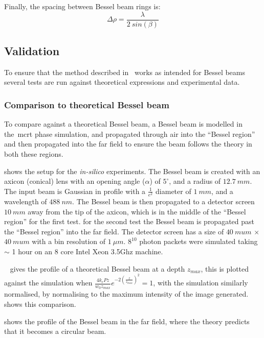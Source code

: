 Finally, the spacing between Bessel beam rings is:
\begin{equation}
\Delta \rho = \frac{\lambda}{2\ sin\left(\beta\right)}
\end{equation}

\subsection{Validation}

To ensure that the method described in~ works as intended for Bessel beams several tests are run against theoretical expressions and experimental data.

\subsubsection*{Comparison to theoretical Bessel beam}

To compare against a theoretical Bessel beam, a Bessel beam is modelled in the~\gls*{mcrt} phase simulation, and propagated through air into the ``Bessel region'' and then propagated into the far field to ensure the beam follows the theory in both these regions.

 shows the setup for the \textit{in-silico} experiments.
The Bessel beam is created with an axicon (conical) lens with an opening angle ($\alpha$) of $5^{\circ}$, and a radius of $12.7~mm$.
The input beam is Gaussian in profile with a $\tfrac{1}{e^2}$ diameter of $1~mm$, and a wavelength of $488~nm$.
The Bessel beam is then propagated to a detector screen $10~mm$ away from the tip of the axicon, which is in the middle of the ``Bessel region'' for the first test.
for the second test the Bessel beam is propagated past the ``Bessel region'' into the far field.
The detector screen has a size of $40~mu m$ $\times$ $40~mu m$ with a bin resolution of $1~\mu m$.
$8^10$ photon packets were simulated taking $\sim$ 1 hour on an 8 core Intel Xeon 3.5Ghz machine.

\medskip

~ gives the profile of a theoretical Bessel beam at a depth $z_{max}$, this is plotted against the simulation when $\tfrac{4k_rPz}{w_0z_{max}}e^{-2\left(\tfrac{z}{z_{max}}\right)^2}=1$, with the simulation similarly normalised, by normalising to the maximum intensity of the image generated. ~ shows this comparison.

 shows the profile of the Bessel beam in the far field, where the theory predicts that it becomes a circular beam.

